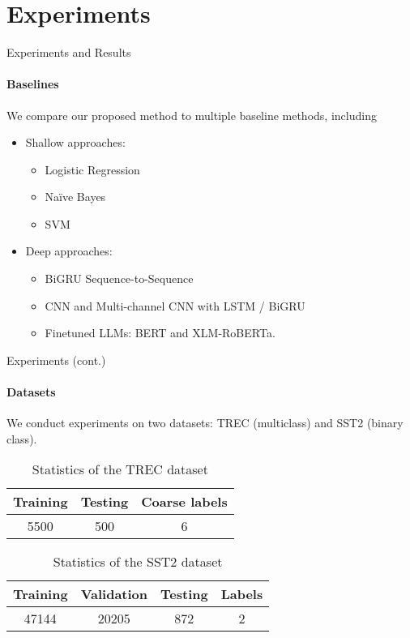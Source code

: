 \section{Experiments}
\begin{frame}{Experiments and Results}
\framesubtitle{Baselines}
We compare our proposed method to multiple baseline methods, including
\begin{itemize}
\item Shallow approaches:
\begin{itemize}
\item Logistic Regression
\item Na\"ive Bayes
\item SVM
\end{itemize}
\item Deep approaches:
\begin{itemize}
\item BiGRU Sequence-to-Sequence
\item CNN and Multi-channel CNN with LSTM / BiGRU
\item Finetuned LLMs: BERT and XLM-RoBERTa.
\end{itemize}
\end{itemize}
\end{frame}

\begin{frame}{Experiments (cont.)}
\framesubtitle{Datasets}

We conduct experiments on two datasets: TREC (multiclass) and SST2 (binary class).

\begin{table}
\centering
\begin{tabular}{|c|c|c|}\hline%
\textbf{Training} & \textbf{Testing} & \textbf{Coarse labels} \\ \hline%
5500              & 500              & 6                    \\ \hline %
\end{tabular}
\caption{Statistics of the TREC dataset\cite{hovy2001, li2002}} \label{tab:trec-insight}
\end{table}

\begin{table}
\centering
\begin{tabular}{|c|c|c|c|} \hline
\textbf{Training} & \textbf{Validation} & \textbf{Testing} & \textbf{Labels} \\ \hline
47144              & 20205              & 872                      & 2 \\ \hline
\end{tabular}
\caption{Statistics of the SST2 dataset\cite{Socher2013}} \label{tab:sst2-insight}
\end{table}
\end{frame}

